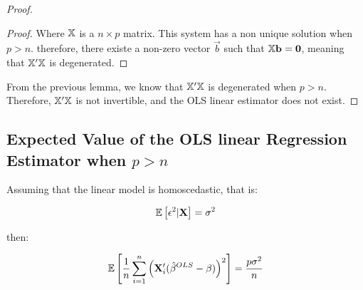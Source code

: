 \begin{claim*}
\begin{proof}
\begin{lemma*}
\begin{proof}
                Where $\mathbb{X}$ is a $n \times p$ matrix. This system has a non unique solution when $p > n$. therefore, there existe a non-zero vector $\Vec{b}$ such that $\mathbb{X}\mathbf{b} = \mathbf{0}$, meaning that $\mathbb{X}'\mathbb{X}$ is degenerated.
            \end{proof}
        \end{lemma*}

        From the previous lemma, we know that $\mathbb{X}'\mathbb{X}$ is degenerated when $p > n$. Therefore, $\mathbb{X}'\mathbb{X}$ is not invertible, and the OLS linear estimator does not exist.
    \end{proof}
\end{claim*}

\subsection{Expected Value of the OLS linear Regression Estimator when $p > n$}

Assuming that the linear model is homoscedastic, that is: 

\begin{align*}
    \mathbb{E}\left[\epsilon^2 | \mathbf{X}\right] = \sigma^2
\end{align*}

then: 

\begin{align*}
\mathbb{E}\left[
    \frac{1}{n}
    \sum_{i=1}^{n} \left(\mathbf{X}_i' 
        (\hat{\beta}^{OLS} - \beta)
    \right)^2
\right]
=
\dfrac{p \sigma^2}{n}
\end{align*}

